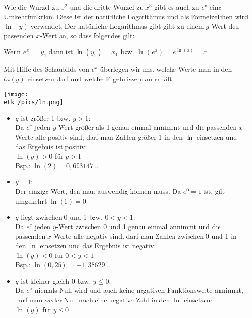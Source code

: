 Wie die Wurzel zu \(x^2\) und die dritte Wurzel zu \(x^3\) gibt es auch zu \(e^x\) eine Umkehrfunktion. Diese ist der natürliche Logarithmus und als Formelzeichen wird \(\ln(y)\) verwendet. Der natürliche Logarithmus gibt gibt zu einem \(y\)-Wert den passenden \(x\)-Wert an, so dass folgendes gilt:
\begin{tcolorbox}\centering
	\textcolor{loestc}{Wenn \(e^{x_1}=y_1\) dann ist \(\ln(y_1)=x_1\) bzw. \(\ln(e^x)=e^{\ln(x)}=x\)}
\end{tcolorbox}
Mit Hilfe des Schaubilds von \(e^x\) überlegen wir uns, welche Werte man in den \(ln(y)\) einsetzen darf und welche Ergebnisse man erhält:\\
\begin{minipage}{\textwidth}\centering
	\texttt{[image: \\eFkt/pics/ln.png]}
\end{minipage}\vspace{0.2cm}
\begin{itemize}
	\item \(y\) ist größer 1 bzw. \(y>1\):\\
	\textcolor{loes}{Da \(e^x\) jeden \(y\)-Wert größer als 1 genau einmal annimmt und die passenden \(x\)-Werte alle positiv sind, darf man Zahlen größer 1 in den \(\ln\) einsetzen und das Ergebnis ist positiv:\\
		\(\ln(y)>0\) für \(y>1\)\\
		Bsp.: \(\ln(2)=0,693147\dots\)}
	\item \(y=1\):\\
	\textcolor{loes}{Der einzige Wert, den man auswendig können muss. Da \(e^0=1\) ist, gilt umgekehrt \(\ln(1)=0\)}\vspace{0.5cm}
	\item \(y\) liegt zwischen 0 und 1 bzw. \(0<y<1\):\\
	\textcolor{loes}{Da \(e^x\) jeden \(y\)-Wert zwischen 0 und 1 genau einmal annimmt und die passenden \(x\)-Werte alle negativ sind, darf man Zahlen zwischen 0 und 1 in den \(\ln\) einsetzen und das Ergebnis ist negativ:\\
		\(\ln(y)<0\) für \(0<y<1\)\\
		Bsp.: \(\ln(0,25)=-1,38629\dots\)}
	\item \(y\) ist kleiner gleich 0 bzw. \(y\leq0\):\\
	\textcolor{loes}{Da \(e^x\) niemals Null wird und auch keine negativen Funktionswerte annimmt, darf man weder Null noch eine negative Zahl in den \(\ln\) einsetzen:\\
		\(\ln(y)\) \Lightning \normalsize für \(y\leq0\)}
\end{itemize}

